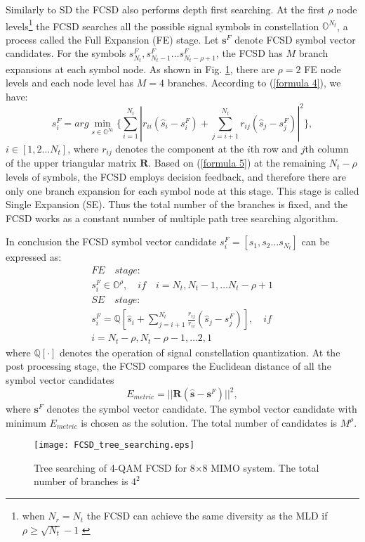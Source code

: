 \documentclass[letterpaper, 10pt, conference]{ieeeconf}
\begin{document}
Similarly to SD the FCSD also performs depth first searching. At the first $\rho$ node levels\footnote{when $N_{r}=N_{t}$ the FCSD can achieve the same diversity as the MLD if $\rho\geq \sqrt{N_{t}}-1$ \cite{barbero2008fixing}} the FCSD searches all the possible signal symbols in constellation $\mathbb{O}^{N_{t}}$, a process called the Full Expansion (FE) stage. Let $\mathbf{s}^{F}$ denote FCSD symbol vector candidates. For the symbols $s^{F}_{N_{t}}, s^{F}_{N_{t}-1}\dots s^{F}_{N_{t}-\rho+1}$, the FCSD has $M$ branch expansions at each symbol node. As shown in Fig. \ref{figure4}, there are $\rho=2$ FE node levels and each node level has $M=4$ branches. According to (\ref{formula 4}), we have: 
\begin{equation}
s^{F}_{i}=arg\min_{s\in \mathbb{O}^{N_{t}}}\{\sum_{i=1}^{N_{t}}|r_{ii}(\hat{s}_{i}-s^{F}_{i})+\sum_{j=i+1}^{N_{t}}r_{ij}(\hat{s}_{j}-s^{F}_{j})|^{2}\},  \label{formula 5}
\end{equation} 
$i\in [1,2\dots N_{t}]$, where $r_{ij}$ denotes the component at the $i$th row and $j$th column of the upper triangular matrix $\mathbf{R}$. Based on (\ref{formula 5}) at the remaining $N_{t}-\rho$ levels of symbols, the FCSD employs decision feedback, and therefore there are only one branch expansion for each symbol node at this stage. This stage is called Single Expansion (SE). 
Thus the total number of the branches is fixed, and the FCSD works as a constant number of multiple path tree searching algorithm.

In conclusion the FCSD symbol vector candidate $s^{F}_{i}=[s_{1},s_{2}\dots s_{N_{t}}]$ can be expressed as:
\begin{equation}
\begin{split}
&FE \quad stage:\\
&{s}_{i}^{F}\in    \mathbb{O}^{\rho},  \quad if\quad i=N_{t},N_{t}-1,\dots N_{t}-\rho+1\\
& SE\quad stage:\\
&{s}_{i}^{F}=\mathbb{Q}[\hat{s}_{i}+\sum_{j=i+1}^{N_{t}}\frac{r_{ij}}{r_{ii}}(\hat{s}_{j}-s_{j}^{F})], \quad if\quad \\
& i = N_{t}-\rho,N_{t}-\rho-1,\dots 2,1 
  \label{FCSD solution}
\end{split}
\end{equation}
where $\mathbb{Q}[\cdot]$ denotes the operation of signal constellation quantization. At the post processing stage, the FCSD compares the Euclidean distance of all the symbol vector candidates
\begin{equation}
E_{metric}=||\mathbf{R}(\mathbf{\hat{s}}-\mathbf{s}^{F})||^{2},
\end{equation} 
where $\mathbf{s}^{F}$ denotes the symbol vector candidate. The symbol vector candidate with minimum $E_{metric}$ is chosen as the solution. The total number of candidates is $M^{\rho}$.  
\begin{figure}[htb]
\centering
\texttt{[image: FCSD\_tree\_searching.eps]}
\caption{Tree searching of 4-QAM FCSD for 8$\times$8 MIMO system. The total number of branches is $4^{2}$}
\label{figure4}
\end{figure}
\end{document}
